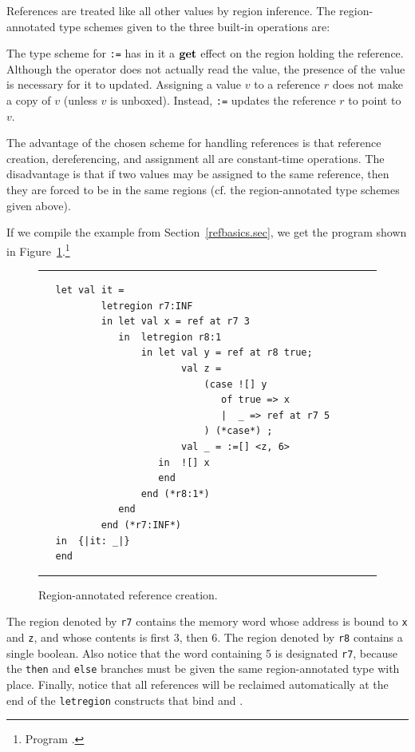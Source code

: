 \documentclass[12pt]{book}
\begin{document}
References are treated like all other values by region inference.  The
region-annotated type schemes given to the three built-in operations
are: \medskip

\medskip

\noindent
The type scheme for \verb+:=+ has in it a $\mathop{\bf get}\nolimits$ effect on the region
holding the reference. Although the operator does not actually read
the value, the presence of the value is necessary for it to updated.
Assigning a value $v$ to a reference $r$ does not make a copy of $v$
(unless $v$ is unboxed). Instead, \verb+:=+ updates the reference $r$
to point to $v$.

The advantage of the chosen scheme for handling references is that
reference creation, dereferencing, and assignment all are
constant-time operations. The disadvantage is that if two values may
be assigned to the same reference, then they are forced to be in the
same regions (cf. the region-annotated type schemes given above).

If we compile the example from Section~\ref{refbasics.sec}, we get the
program shown in Figure~\ref{otherrefs.fig}.\footnote{Program
  .}
\begin{figure}
\hrule
\medskip
\begin{verbatim}
   let val it = 
           letregion r7:INF 
           in let val x = ref at r7 3
              in  letregion r8:1 
                  in let val y = ref at r8 true; 
                         val z = 
                             (case ![] y 
                                of true => x
                                |  _ => ref at r7 5
                             ) (*case*) ; 
                         val _ = :=[] <z, 6>
                     in  ![] x
                     end  
                  end (*r8:1*)
              end  
           end (*r7:INF*)
   in  {|it: _|}
   end 
\end{verbatim}
\caption{Region-annotated reference creation.}
\label{otherrefs.fig}
\medskip
\hrule
\end{figure}
The region denoted by {\tt r7} contains the memory word whose address
is bound to {\tt x} and {\tt z}, and whose contents is first 3, then
6.  The region denoted by {\tt r8} contains a single boolean.  Also
notice that the word containing 5 is designated {\tt r7}, because the
{\tt then} and {\tt else} branches must be given the same
region-annotated type with place. Finally, notice that all references
will be reclaimed automatically at the end of the {\tt letregion}
constructs that bind  and .
\end{document}
